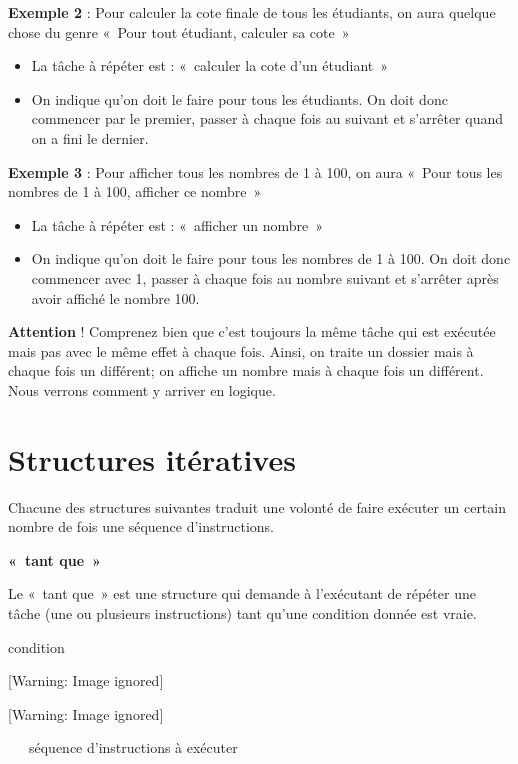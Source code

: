 {
\textbf{Exemple 2} : Pour calculer la cote finale de tous les étudiants,
on aura quelque chose du genre «~Pour tout étudiant, calculer sa
cote~»}

\liststyleListv
\begin{itemize}
\item {
La tâche à répéter est : «~calculer la cote d'un
étudiant~»}
\item {
On indique qu'on doit le faire pour tous les étudiants.
On doit donc commencer par le premier, passer à chaque fois au suivant
et s'arrêter quand on a fini le dernier.}
\end{itemize}
{
\textbf{Exemple 3} : Pour afficher tous les nombres de 1 à 100, on aura
«~Pour tous les nombres de 1 à 100, afficher ce nombre~»}

\liststyleListv
\begin{itemize}
\item {
La tâche à répéter est : «~afficher un nombre~»}
\item {
On indique qu'on doit le faire pour tous les nombres de
1 à 100. On doit donc commencer avec 1, passer à chaque fois au nombre
suivant et s'arrêter après avoir affiché le nombre
100.}
\end{itemize}
{
\textbf{Attention} ! Comprenez bien que c'est toujours
la même tâche qui est exécutée mais pas avec le même effet à chaque
fois. Ainsi, on traite un dossier mais à chaque fois un différent; on
affiche un nombre mais à chaque fois un différent. Nous verrons comment
y arriver en logique.}

\section{Structures itératives}
{
Chacune des structures suivantes traduit une volonté de faire exécuter
un certain nombre de fois une séquence d’instructions. }

{\sffamily\bfseries
«~tant que~»}

{
Le «~tant que~» est une structure qui demande à
l'exécutant de répéter une tâche (une ou plusieurs
instructions) tant qu'une condition donnée est vraie.}

{\sffamily
{} condition }

\begin{center}
 [Warning: Image ignored] %

\end{center}
\begin{center}
 [Warning: Image ignored] %

\end{center}
{\sffamily
\ \  \ séquence d’instructions à exécuter }

